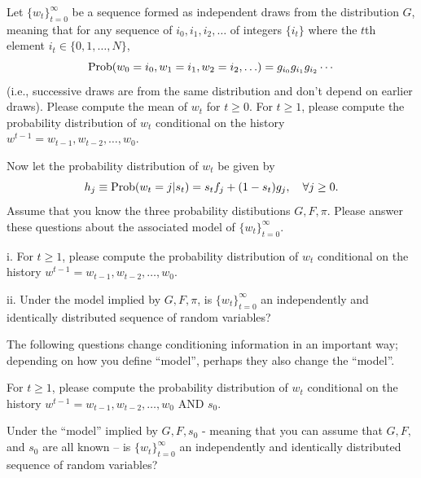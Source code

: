 \medskip
{}  Let  $\{w_t\}_{t=0}^\infty$ be a sequence formed as independent draws from the distribution $G$, meaning that
for any sequence of $i_0, i_1, i_2, \ldots $ of integers $\{i_t\}$ where the $t$th element $i_t  \in \{0, 1, \ldots, N\}$,
 $${\rm Prob}(w_0 = i_0, w_1 = i_1, w_2 = i_2, \ldots)  = g_{i_0} g_{i_1} g_{i_2}  \cdots $$
(i.e., successive draws are from the same distribution and don't depend on earlier draws). Please compute the mean of $w_t$ for $t \geq 0$.
For $t \geq 1$,
please compute the probability distribution of  $w_t$ conditional on the history $w^{t-1} = w_{t-1}, w_{t-2}, \ldots, w_0$.

\medskip
{} Now let  the probability distribution of $w_t$  be given by
$$ h_j \equiv {\rm Prob}(w_t = j | s_t)  = s_t f_j + (1-s_t) g_j ,  \quad \forall j \geq 0. $$
Assume that you know the three probability distibutions $G, F, \pi$.
Please answer these questions about the associated   model of  $\{w_t\}_{t=0}^\infty$.


\smallskip
\item{i.}  For $t \geq 1$,
please compute the probability distribution of  $w_t$ conditional on the history $w^{t-1} = w_{t-1}, w_{t-2}, \ldots, w_0$.


\item{ii.} Under the model implied by $G, F, \pi$, is $\{w_t\}_{t=0}^\infty$ an independently and identically distributed sequence of random variables?




\noindent The following questions change conditioning information in an important way; depending on how you define ``model'', perhaps they also change the ``model''.


\medskip
{} For $t \geq 1$,
please compute the probability distribution of  $w_t$ conditional on  the history $w^{t-1} = w_{t-1}, w_{t-2}, \ldots, w_0$ AND $s_0$.

\medskip
{} Under the ``model'' implied by $G, F, s_0$  - meaning that you can assume that $G, F,$ and $s_0$ are all known --  is $\{w_t\}_{t=0}^\infty$ an independently and identically distributed sequence of random variables?





\bye

